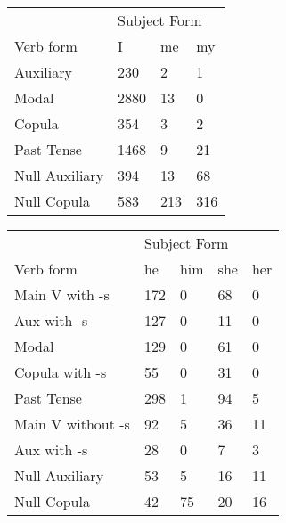\begin{table}[]
\begin{minipage}{0.5\textwidth}
    \centering
    \begin{tabular}{@{}llll@{}}
        \toprule
            &\multicolumn{3}{l}{Subject Form}\\
            \cline{2-4}
        Verb form & I & me & my \\
        \midrule
        Auxiliary & 230 & 2 & 1 \\
        Modal & 2880 & 13 & 0 \\
        Copula & 354 & 3 & 2 \\
        Past Tense & 1468 & 9 & 21 \\
        \hline
        Null Auxiliary & 394 & 13 & 68 \\
        Null Copula & 583 & 213 & 316 \\
        \bottomrule
    \end{tabular}
\end{minipage}
\begin{minipage}{0.5\textwidth}
    \centering
    \begin{tabular}{@{}lllll@{}}
        \toprule
            &\multicolumn{4}{l}{Subject Form}\\
            \cline{2-5}
        Verb form & he & him & she & her \\
        \midrule
        Main V with -s & 172 & 0 & 68 & 0 \\
        Aux with -s & 127 & 0 & 11 & 0 \\
        Modal & 129 & 0 & 61 & 0 \\
        Copula with -s & 55 & 0 & 31 & 0 \\
        Past Tense & 298 & 1 & 94 & 5 \\
        \hline
        Main V without -s & 92 & 5 & 36 & 11 \\
        Aux with -s & 28 & 0 & 7 & 3 \\
        Null Auxiliary & 53 & 5 & 16 & 11 \\
        Null Copula & 42 & 75 & 20 & 16 \\
        \bottomrule
    \end{tabular}
    \end{minipage}
\end{table}
